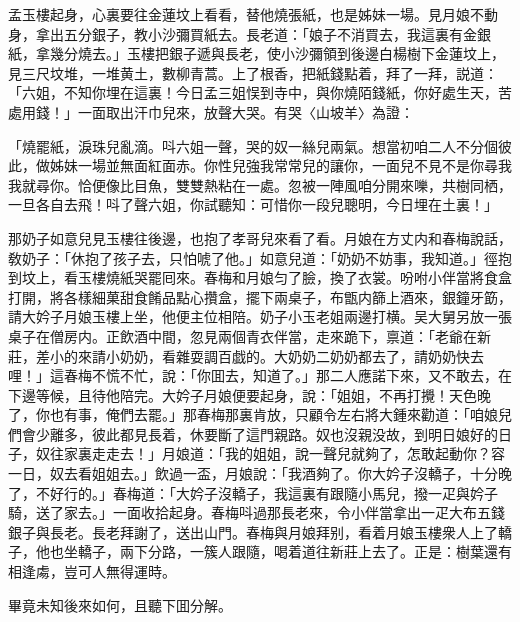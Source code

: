 孟玉樓起身，心裏要往金蓮坟上看看，替他燒張紙，也是姊妹一場。見月娘不動身，拿出五分銀子，教小沙彌買紙去。長老道：「娘子不消買去，我這裏有金銀紙，拿幾分燒去。」玉樓把銀子遞與長老，使小沙彌領到後邊白楊樹下金蓮坟上，見三尺坟堆，一堆黄土，數柳青蒿。上了根香，把紙錢點着，拜了一拜，説道：「六姐，不知你埋在這裏！今日孟三姐悮到寺中，與你燒陌錢紙，你好處生天，苦處用錢！」一面取出汗巾兒來，放聲大哭。有哭〈山坡羊〉為證：

\begin{myquote}
「燒罷紙，淚珠兒亂滴。呌六姐一聲，哭的奴一絲兒兩氣。想當初咱二人不分個彼此，做姊妹一場並無面紅面赤。你性兒強我常常兒的讓你，一面兒不見不是你尋我我就尋你。恰便像比目魚，雙雙熱粘在一處。忽被一陣風咱分開來嚛，共樹同栖，一旦各自去飛！呌了聲六姐，你試聽知：可惜你一段兒聰明，今日埋在土裏！」
\end{myquote}

那奶子如意兒見玉樓往後邊，也抱了孝哥兒來看了看。月娘在方丈内和春梅說話，敎奶子：「休抱了孩子去，只怕唬了他。」如意兒道：「奶奶不妨事，我知道。」徑抱到坟上，看玉樓燒紙哭罷囘來。春梅和月娘匀了臉，換了衣裳。吩咐小伴當將食盒打開，將各樣細菓甜食餚品點心攢盒，擺下兩桌子，布甑内篩上酒來，銀鐘牙筯，請大妗子月娘玉樓上坐，他便主位相陪。奶子小玉老姐兩邊打横。吴大舅另放一張桌子在僧房内。正飲酒中間，忽見兩個青衣伴當，走來跪下，禀道：「老爺在新莊，差小的來請小奶奶，看雜耍調百戯的。大奶奶二奶奶都去了，請奶奶快去哩！」這春梅不慌不忙，說：「你囬去，知道了。」那二人應諾下來，又不敢去，在下邊等候，且待他陪完。大妗子月娘便要起身，說：「姐姐，不再打攪！天色晚了，你也有事，俺們去罷。」那春梅那裏肯放，只顧令左右將大鍾來勸道：「咱娘兒們會少離多，彼此都見長着，休要斷了這門親路。奴也沒親没故，到明日娘好的日子，奴往家裏走走去！」月娘道：「我的姐姐，說一聲兒就夠了，怎敢起動你？容一日，奴去看姐姐去。」飲過一盃，月娘說：「我酒夠了。你大妗子沒轎子，十分晚了，不好行的。」春梅道：「大妗子沒轎子，我這裏有跟隨小馬兒，撥一疋與妗子騎，送了家去。」一面收拾起身。春梅呌過那長老來，令小伴當拿出一疋大布五錢銀子與長老。長老拜謝了，送出山門。春梅與月娘拜别，看着月娘玉樓衆人上了轎子，他也坐轎子，兩下分路，一簇人跟隨，喝着道往新莊上去了。正是：樹葉還有相逢䖏，豈可人無得運時。

畢竟未知後來如何，且聽下囬分解。

